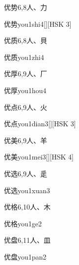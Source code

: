 \begin{entry}{优势}{6,8}{⼈、⼒}
  \begin{phonetics}{优势}{you1shi4}[][HSK 3]
  \end{phonetics}
\end{entry}

\begin{entry}{优质}{6,8}{⼈、⾙}
  \begin{phonetics}{优质}{you1zhi4}
  \end{phonetics}
\end{entry}

\begin{entry}{优厚}{6,9}{⼈、⼚}
  \begin{phonetics}{优厚}{you1hou4}
  \end{phonetics}
\end{entry}

\begin{entry}{优点}{6,9}{⼈、⽕}
  \begin{phonetics}{优点}{you1dian3}[][HSK 3]
  \end{phonetics}
\end{entry}

\begin{entry}{优美}{6,9}{⼈、⽺}
  \begin{phonetics}{优美}{you1mei3}[][HSK 4]
  \end{phonetics}
\end{entry}

\begin{entry}{优选}{6,9}{⼈、⾡}
  \begin{phonetics}{优选}{you1xuan3}
  \end{phonetics}
\end{entry}

\begin{entry}{优格}{6,10}{⼈、⽊}
  \begin{phonetics}{优格}{you1ge2}
  \end{phonetics}
\end{entry}

\begin{entry}{优盘}{6,11}{⼈、⽫}
  \begin{phonetics}{优盘}{you1pan2}
  \end{phonetics}
\end{entry}

